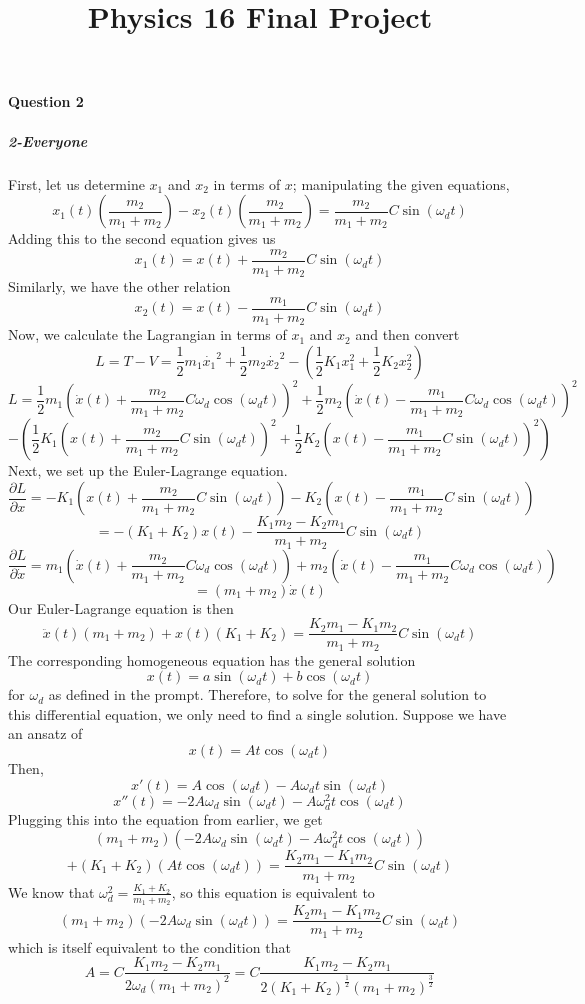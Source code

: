 \title{Physics 16 Final Project}
\newcommand{\f}{\frac} 
\newcommand{\om}{\omega}
\newcommand{\pdif}[2]{\f{\partial #1}{\partial #2}}
\newcommand{\dif}[2]{\f{d#1}{d#2}}


\paragraph{Question 2}
\subparagraph{2-Everyone}
First, let us determine $x_1$ and $x_2$ in terms of $x$; manipulating the given equations,
$$x_1(t)(\f{m_2}{m_1+m_2})-x_2(t)(\f{m_2}{m_1+m_2})=\f{m_2}{m_1+m_2} C\sin(\om_d t)$$
Adding this to the second equation gives us
$$x_1(t)=x(t)+\f{m_2}{m_1+m_2} C\sin(\om_d t)$$
Similarly, we have the other relation
$$x_2(t)=x(t)-\f{m_1}{m_1+m_2}C\sin(\om_d t)$$
Now, we calculate the Lagrangian in terms of $x_1$ and $x_2$ and then convert
$$L=T-V=\f 1 2 m_1 \dot{x_1}^2+\f 1 2 m_2 \dot{x_2}^2-(\f 1 2 K_1 x_1^2+\f 1 2 K_2 x_2^2)$$
$$L=\f 1 2 m_1(\dot x(t)+\f{m_2}{m_1+m_2} C\om_d \cos(\om_d t))^2+\f 1 2 m_2(\dot x(t) -\f{m_1}{m_1+m_2} C\om_d \cos(\om_d t))^2$$
$$-(\f 1 2 K_1 (x(t)+\f{m_2}{m_1+m_2} C\sin(\om_d t))^2+\f 1 2 K_2 ( x(t)-\f{m_1}{m_1+m_2} C\sin(\om_d t))^2)$$
Next, we set up the Euler-Lagrange equation.
$$\pdif L x=-K_1 (x(t)+\f{m_2}{m_1+m_2}C\sin(\om_d t))-K_2 (x(t)-\f{m_1}{m_1+m_2} C\sin(\om_d t))$$
$$=-(K_1+K_2) x(t)-\f{K_1 m_2-K_2 m_1}{m_1+m_2}C \sin(\om_d t)$$
$$\pdif L {\dot x} = m_1 (\dot x(t)+\f{m_2}{m_1+m_2} C \om_d \cos(\om_d t))+m_2  (\dot x(t)-\f{m_1}{m_1+m_2} C \om_d \cos(\om_d t))$$
$$= (m_1+m_2) \dot x(t)$$
Our Euler-Lagrange equation is then
$$\ddot x(t) (m_1+m_2)+ x(t) (K_1+K_2)=\f{K_2 m_1-K_1 m_2}{m_1+m_2} C \sin(\om_d t)$$
The corresponding homogeneous equation has the general solution
$$x(t)= a \sin(\om_d t)+b\cos(\om_d t)$$
for $\om_d$ as defined in the prompt.  Therefore, to solve for the general solution to this differential equation, we only need to find a single solution.  Suppose we have an ansatz of
$$x(t)=A t\cos(\om_d t)$$
Then, 
$$x'(t)= A\cos(\om_d t)-A\om_d t\sin(\om_d t)$$
$$x''(t)=-2A\om_d \sin(\om_d t)-A\om_d^2 t \cos(\om_d t)$$
Plugging this into the equation from earlier, we get
$$(m_1+m_2)(-2A\om_d \sin(\om_d t)-A\om_d^2 t \cos(\om_d t))$$
$$+(K_1+K_2)( A t \cos(\om_d t))=\f{K_2 m_1-K_1 m_2}{m_1+m_2} C \sin(\om_d t)$$
We know that $\om_d^2 = \f{K_1+K_2}{m_1+m_2}$, so this equation is equivalent to
$$(m_1+m_2)(-2A\om_d \sin(\om_d t))=\f{K_2 m_1-K_1 m_2}{m_1+m_2} C \sin(\om_d t)$$
which is itself equivalent to the condition that
$$A=C\f{K_1 m_2-K_2 m_1}{2\om_d(m_1+m_2)^2}=C\f{K_1 m_2-K_2 m_1}{2(K_1+K_2)^{\f 1 2}(m_1+m_2)^{\f 3 2}}$$
